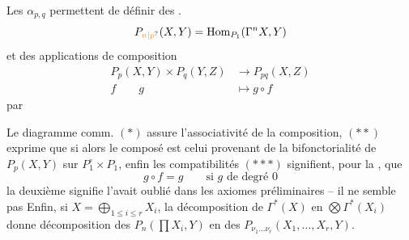 Les $\alpha_{p,q}$ permettent de définir des
\uline{}.
\[
P_{\unsure{n|p}}(X,Y)=\operatorname{Hom}_{P_1}(\Gamma^n X,Y)
\]
et des applications de composition
\[
\begin{aligned}
P_p(X,Y)\times P_q(Y,Z)&\longrightarrow P_{pq}(X,Z)\\
f\qquad g&\longmapsto g\circ f
\end{aligned}
\]
par

Le diagramme comm. $(*)$ assure l'associativité
de la composition, $(**)$  exprime que si   alors le composé est celui
provenant de la bifonctorialité de
$P_p(X,Y)$ sur $P_1^\circ\times P_1$, enfin les compatibilités
$(***)$ signifient, pour la , que
\[
g\circ f=g\qquad\text{si $g$ de degré $0$}
\]
la deuxième signifie
 l'avait oublié dans les axiomes
préliminaires -- il ne semble pas
Enfin, si $X=\bigoplus_{1\leq i\leq r}X_i$, la décomposition
de $\Gamma^*(X)$ en  $\bigotimes\Gamma^*(X_i)$ donne
 décomposition des $P_n(\prod X_i,Y)$ en
des $P_{\nu_1\ldots\nu_r}(X_1,\ldots,X_r,Y)$.

